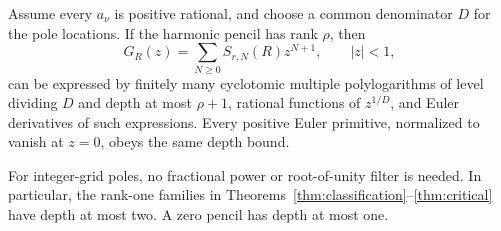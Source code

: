 \begin{theorem}
\label{thm:depth}
Assume every $a_\nu$ is positive rational, and choose a common denominator
$D$ for the pole locations. If the harmonic pencil has rank $\rho$, then
\begin{equation}\label{eq:generator-general}
 G_R(z)=\sum_{N\ge0}S_{r,N}(R)z^{N+1},\qquad |z|<1,
\end{equation}
can be expressed by finitely many cyclotomic multiple polylogarithms
of level dividing $D$ and depth at most $\rho+1$, rational functions
of $z^{1/D}$, and Euler derivatives of such expressions.
Every positive Euler primitive, normalized to vanish at $z=0$, obeys
the same depth bound.

For integer-grid poles, no fractional power or root-of-unity filter
is needed. In particular, the rank-one families in
Theorems~\ref{thm:classification}--\ref{thm:critical} have depth at
most two. A zero pencil has depth at most one.
\end{theorem}
